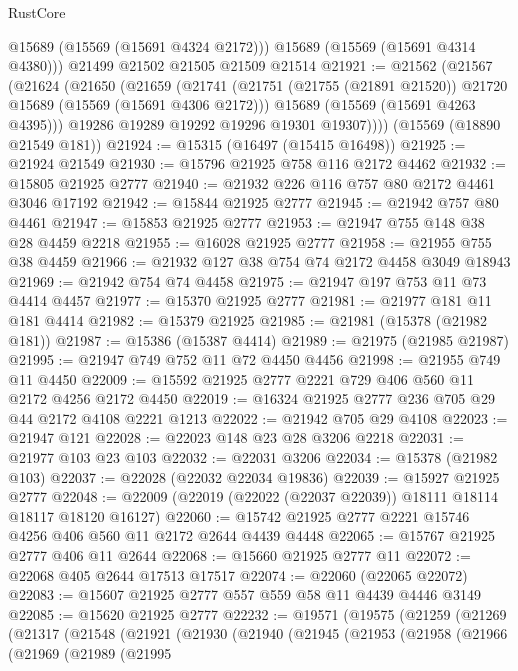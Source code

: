 \begin{lexlean}{RustCore}
\begin{coremodule}
        @15689
        (@15569 (@15691 @4324 @2172)))
      @15689
      (@15569 (@15691 @4314 @4380)))
    @21499
    @21502
    @21505
    @21509
    @21514
@21921 := @21562
    (@21567
      (@21624
        (@21650
          (@21659
            (@21741
              (@21751 (@21755 (@21891 @21520)) @21720 @15689 (@15569 (@15691 @4306 @2172)))
              @15689
              (@15569 (@15691 @4263 @4395)))
            @19286
            @19289
            @19292
            @19296
            @19301
            @19307))))
    (@15569 (@18890 @21549 @181))
@21924 := @15315 (@16497 (@15415 @16498))
@21925 := @21924 @21549
@21930 := @15796 @21925 @758 @116 @2172 @4462
@21932 := @15805 @21925 @2777
@21940 := @21932 @226 @116 @757 @80 @2172 @4461 @3046 @17192
@21942 := @15844 @21925 @2777
@21945 := @21942 @757 @80 @4461
@21947 := @15853 @21925 @2777
@21953 := @21947 @755 @148 @38 @28 @4459 @2218
@21955 := @16028 @21925 @2777
@21958 := @21955 @755 @38 @4459
@21966 := @21932 @127 @38 @754 @74 @2172 @4458 @3049 @18943
@21969 := @21942 @754 @74 @4458
@21975 := @21947 @197 @753 @11 @73 @4414 @4457
@21977 := @15370 @21925 @2777
@21981 := @21977 @181 @11 @181 @4414
@21982 := @15379 @21925
@21985 := @21981 (@15378 (@21982 @181))
@21987 := @15386 (@15387 @4414)
@21989 := @21975 (@21985 @21987)
@21995 := @21947 @749 @752 @11 @72 @4450 @4456
@21998 := @21955 @749 @11 @4450
@22009 := @15592 @21925 @2777 @2221 @729 @406 @560 @11 @2172 @4256 @2172 @4450
@22019 := @16324 @21925 @2777 @236 @705 @29 @44 @2172 @4108 @2221 @1213
@22022 := @21942 @705 @29 @4108
@22023 := @21947 @121
@22028 := @22023 @148 @23 @28 @3206 @2218
@22031 := @21977 @103 @23 @103
@22032 := @22031 @3206
@22034 := @15378 (@21982 @103)
@22037 := @22028 (@22032 @22034 @19836)
@22039 := @15927 @21925 @2777
@22048 := @22009 (@22019 (@22022 (@22037 @22039)) @18111 @18114 @18117 @18120 @16127)
@22060 := @15742 @21925 @2777 @2221 @15746 @4256 @406 @560 @11 @2172 @2644 @4439 @4448
@22065 := @15767 @21925 @2777 @406 @11 @2644
@22068 := @15660 @21925 @2777 @11
@22072 := @22068 @405 @2644 @17513 @17517
@22074 := @22060 (@22065 @22072)
@22083 := @15607 @21925 @2777 @557 @559 @58 @11 @4439 @4446 @3149
@22085 := @15620 @21925 @2777
@22232 := @19571
    (@19575
      (@21259
        (@21269
          (@21317
            (@21548
              (@21921
                (@21930
                  (@21940
                    (@21945
                      (@21953
                        (@21958
                          (@21966
                            (@21969
                              (@21989
                                (@21995

\end{coremodule}
\end{lexlean}
